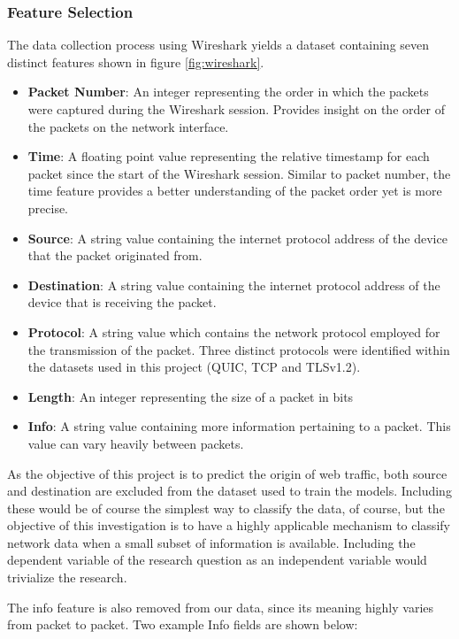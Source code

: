 \documentclass[10pt,sigconf,letterpaper,nonacm]{acmart}
\begin{document}
\subsubsection{Feature Selection}
The data collection process using Wireshark yields a dataset containing seven distinct features shown in figure \ref{fig:wireshark}. 
\begin{itemize}
  \item \textbf{Packet Number}: An integer representing the order in which the packets were captured during the Wireshark session. Provides insight on the order of the packets on the network interface. 
  \item \textbf{Time}: A floating point value representing the relative timestamp for each packet since the start of the Wireshark session. Similar to packet number, the time feature provides a better understanding of the packet order yet is more precise.
  \item \textbf{Source}: A string value containing the internet protocol address of the device that the packet originated from. 
  \item \textbf{Destination}: A string value containing the internet protocol address of the device that is receiving the packet. 
  \item \textbf{Protocol}: A string value which contains the network protocol employed for the transmission of the packet. Three distinct protocols were identified within the datasets used in this project (QUIC, TCP and TLSv1.2).
  \item \textbf{Length}: An integer representing the size of a packet in bits 
  \item \textbf{Info}: A string value containing more information pertaining to a packet. This value can vary heavily between packets.
\end{itemize} 
As the objective of this project is to predict the origin of web traffic, both source and destination are excluded from the dataset used to train the models. 
Including these would be of course the simplest way to classify the data, of course, but the objective of this investigation is to have a highly applicable mechanism to classify network data when a small subset of information is available. 
Including the dependent variable of the research question as an independent variable would trivialize the research.

The info feature is also removed from our data, since its meaning highly varies from packet to packet. Two example Info fields are shown below:
\end{document}
